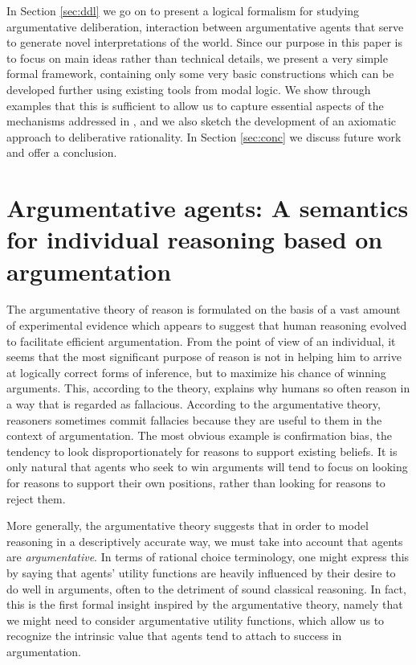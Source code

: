 \documentclass[greybox]{svmult}
\begin{document}
In Section \ref{sec:ddl} we go on to present a logical formalism for studying argumentative deliberation, interaction between argumentative agents that serve to generate novel interpretations of the world. Since our purpose in this paper is to focus on main ideas rather than technical details, we present a very simple formal framework, containing only some very basic constructions which can be developed further using existing tools from modal logic. We show through examples that this is sufficient to allow us to capture essential aspects of the mechanisms addressed in \cite{mercier}, and we also sketch the development of an axiomatic approach to deliberative rationality. In Section \ref{sec:conc} we discuss future work and offer a conclusion.

\section{Argumentative agents: A semantics for individual reasoning based on argumentation}\label{sec:arg}

The argumentative theory of reason is formulated on the basis of a vast amount of experimental evidence which appears to suggest that human reasoning evolved to facilitate efficient argumentation. From the point of view of an individual, it seems that the most significant purpose of reason is not in helping him to arrive at logically correct forms of inference, but to maximize his chance of winning arguments. This, according to the theory, explains why humans so often reason in a way that is regarded as fallacious. According to the argumentative theory, reasoners sometimes commit fallacies because they are useful to them in the context of argumentation. The most obvious example is confirmation bias, the tendency to look disproportionately for reasons to support existing beliefs. It is only natural that agents who seek to win arguments will tend to focus on looking for reasons to support their own positions, rather than looking for reasons to reject them.

More generally, the argumentative theory suggests that in order to model reasoning in a descriptively accurate way, we must take into account that agents are \emph{argumentative}. In terms of rational choice terminology, one might express this by saying that agents' utility functions are heavily influenced by their desire to do well in arguments, often to the detriment of sound classical reasoning. In fact, this is the first formal insight inspired by the argumentative theory, namely that we might need to consider argumentative utility functions, which allow us to recognize the intrinsic value that agents tend to attach to success in argumentation.
\end{document}
